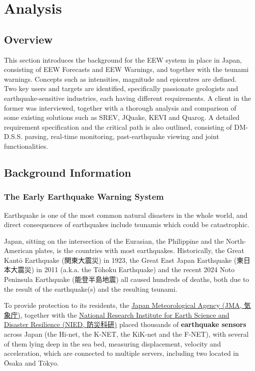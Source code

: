 \chapter{Analysis}
\section*{Overview}
This section introduces the background for the EEW system in place in Japan, consisting of EEW Forecasts and EEW Warnings, and together with the tsunami warnings. Concepts such as intensities, magnitude and epicentres are defined. Two key users and targets are identified, specifically passionate geologists and earthquake-sensitive industries, each having different requirements. A client in the former was interviewed, together with a thorough analysis and comparison of some existing solutions such as SREV, JQuake, KEVI and Quarog. A detailed requirement specification and the critical path is also outlined, consisting of DM-D.S.S. parsing, real-time monitoring, past-earthquake viewing and joint functionalities.

\section{Background Information}

\subsection{The Early Earthquake Warning System}

Earthquake is one of the most common natural disasters in the whole world, and direct consequences of earthquakes include tsunamis which could be catastrophic.

Japan, sitting on the intersection of the Eurasian, the Philippine and the North-American plates, is the countries with most earthquakes. Historically, the Great Kant\=o Earthquake (関東大震災) in 1923, the Great East Japan Earthquake (東日本大震災) in 2011 (a.k.a. the T\=ohoku Earthquake) and the recent 2024 Noto Peninsula Earthquake (能登半島地震) all caused hundreds of deaths, both due to the result of the earthquake(s) and the resulting tsunami.

To provide protection to its residents, the \href{https://www.jma.go.jp/jma/index.html}{Japan Meteorological Agency (JMA, 気象庁)}, together with the \href{https://www.bosai.go.jp}{National Research Institute for Earth Science and Disaster Resilience (NIED, 防災科研)} placed thousands of \textbf{earthquake sensors} across Japan (the Hi-net, the K-NET, the KiK-net and the F-NET), with several of them lying deep in the sea bed, measuring displacement, velocity and acceleration, which are connected to multiple servers, including two located in \=Osaka and T\=okyo.

